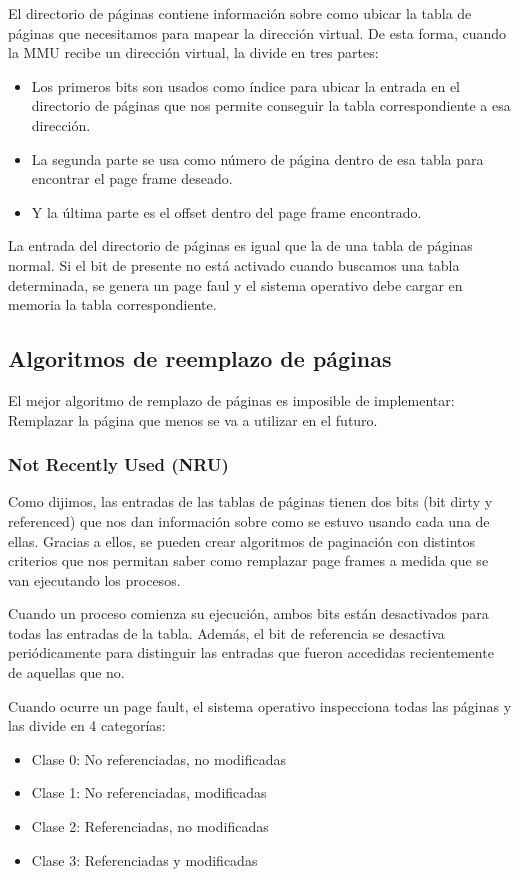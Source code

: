 El directorio de páginas contiene información sobre como ubicar la tabla de páginas que necesitamos para mapear la dirección virtual. De esta forma, cuando la MMU recibe un dirección virtual, la divide en tres partes:

\begin{itemize}
	\item Los primeros bits son usados como índice para ubicar la entrada en el directorio de páginas que nos permite conseguir la tabla correspondiente a esa dirección.
	\item La segunda parte se usa como número de página dentro de esa tabla para encontrar el page frame deseado.
	\item Y la última parte es el offset dentro del page frame encontrado.
\end{itemize}

La entrada del directorio de páginas es igual que la de una tabla de páginas normal. Si el bit de presente no está activado cuando buscamos una tabla determinada, se genera un page faul y el sistema operativo debe cargar en memoria la tabla correspondiente.

\subsection{Algoritmos de reemplazo de páginas}
El mejor algoritmo de remplazo de páginas es imposible de implementar: Remplazar la página que menos se va a utilizar en el futuro.

\subsubsection{Not Recently Used (NRU)}
Como dijimos, las entradas de las tablas de páginas tienen dos bits (bit dirty y referenced) que nos dan información sobre como se estuvo usando cada una de ellas. Gracias a ellos, se pueden crear algoritmos de paginación con distintos criterios que nos permitan saber como remplazar page frames a medida que se van ejecutando los procesos.

Cuando un proceso comienza su ejecución, ambos bits están desactivados para todas las entradas de la tabla. Además, el bit de referencia se desactiva periódicamente para distinguir las entradas que fueron accedidas recientemente de aquellas que no.

Cuando ocurre un page fault, el sistema operativo inspecciona todas las páginas y las divide en 4 categorías:

\begin{itemize}
	\item Clase 0: No referenciadas, no modificadas
	\item Clase 1: No referenciadas, modificadas
	\item Clase 2: Referenciadas, no modificadas
	\item Clase 3: Referenciadas y modificadas
\end{itemize}

